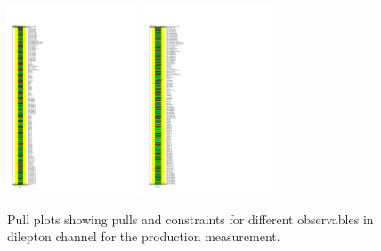 \begin{figure}[ht]
  \centering
  \includegraphics[width=0.35\textwidth]{figures/diff_xsec/dilep_tty_prod_mu_blinded/compare_NP_pulls/compare_NP_dilep_fits_pt_ptj1_ptll/NuisPar_comp.pdf}
  \quad \quad 
  \includegraphics[width=0.35\textwidth]{figures/diff_xsec/dilep_tty_prod_mu_blinded/compare_NP_pulls/compare_NP_dilep_fits_dr_dr1_dr2/NuisPar_comp.pdf}
  \caption{Pull plots showing pulls and constraints for different observables in dilepton channel for the \tty production measurement.}
  \label{fig:pull_plot_pt_tty_dec_free_dilep_mu_blinded_1}
\end{figure}
\FloatBarrier

